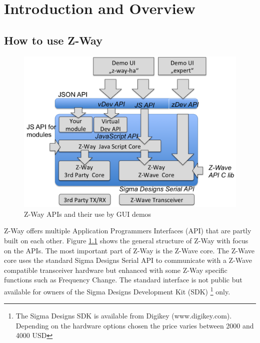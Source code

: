 \chapter{Introduction and Overview}
\label{intro}

\section{How to use Z-Way}

\begin{figure} 
\includegraphics[scale=0.8]{pics/apis.png}
\caption{Z-Way APIs and their use by GUI demos}
\label{apis} 
\end{figure}

Z-Way offers multiple Application Programmers Interfaces (API) that are partly built on each other.
Figure \ref{apis} shows the general structure of Z-Way with focus on the APIs. The most important part of
Z-Way is the Z-Wave core. The Z-Wave core uses the standard
Sigma Designs Serial API to communicate with a Z-Wave compatible transceiver hardware but 
enhanced with some Z-Way specific functions such as Frequency Change. The standard
interface is not public but available for owners of the Sigma Designs Development Kit (SDK) 
\footnote{The Sigma Designs SDK is available from Digikey (www.digikey.com). Depending on the 
hardware options chosen the price varies between 2000 and 4000 USD} only.  

